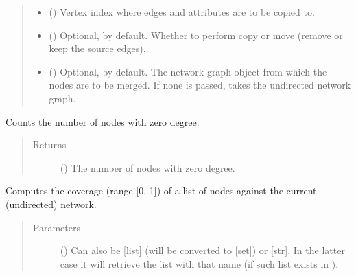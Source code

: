 \documentclass[letterpaper,10pt,english]{sphinxmanual}
\begin{document}
\begin{fulllineitems}
\begin{fulllineitems}
\begin{quote}
\begin{description}
\begin{itemize}
\item {} 
 () \textendash{} Vertex index where edges and attributes are to be copied to.

\item {} 
 () \textendash{} Optional,  by default. Whether to perform copy or
move (remove or keep the source edges).

\item {} 
 () \textendash{} Optional,  by default. The network graph object from
which the nodes are to be merged. If none is passed, takes
the undirected network graph.

\end{itemize}

\end{description}\end{quote}

\end{fulllineitems}


\begin{fulllineitems}
\label{\detokenize{main:pypath.main.PyPath.count_sol}}
Counts the number of nodes with zero degree.
\begin{quote}\begin{description}
\item[{Returns}] \leavevmode
() \textendash{} The number of nodes with zero degree.

\end{description}\end{quote}

\end{fulllineitems}


\begin{fulllineitems}
\label{\detokenize{main:pypath.main.PyPath.coverage}}
Computes the coverage (range {[}0, 1{]}) of a list of nodes against
the current (undirected) network.
\begin{quote}\begin{description}
\item[{Parameters}] \leavevmode
{} () \textendash{} Can also be {[}list{]} (will be converted to {[}set{]}) or {[}str{]}. In
the latter case it will retrieve the list with that name (if
such list exists in ).


\end{description}
\end{quote}
\end{fulllineitems}
\end{fulllineitems}
\end{document}
